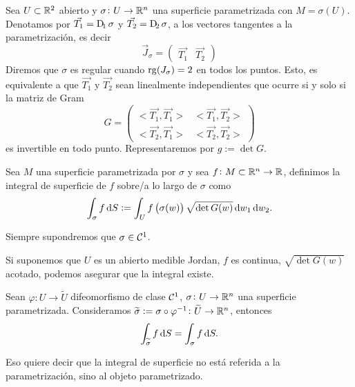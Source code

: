 \begin{defi}
    Sea $U \subset  \mathbb{R}^2$ abierto y $\sigma \colon U \to \mathbb{R}^n$ una superficie parametrizada con $M = \sigma(U)$. Denotamos por
    $\vec{T_1} = \Dif_1\sigma$ y $\vec{T_2} = \Dif_2 \sigma$, a los vectores tangentes a la parametrización, es decir
    \[
        \vec{J}_\sigma =
        \begin{pmatrix}
            \vec{T_1} & \vec{T_2}
        \end{pmatrix}
    \]
    Diremos que $\sigma$ es regular cuando $\operatorname{rg}(J_\sigma) = 2$ en todos los puntos. Esto, es equivalente a que $\vec{T_1}$ y $\vec{T_2}$ sean
    linealmente independientes que ocurre si y solo si la matriz de Gram
    \[
        G = 
        \begin{pmatrix}
            <\vec{T_1}, \vec{T_1}> & <\vec{T_1}, \vec{T_2}> \\
            <\vec{T_2}, \vec{T_1}> & <\vec{T_2}, \vec{T_2}>
        \end{pmatrix}
    \]
    es invertible en todo punto. Representaremos por $g := \det G$.
\end{defi}

\begin{defi}
    Sea $M$ una superficie parametrizada por $\sigma$ y sea $f \colon M \subset \mathbb{R}^n \to \mathbb{R}$, definimos la integral de superficie de $f$
    sobre/a lo largo de $\sigma$ como
    \[
        \int_\sigma f \dif S := \int_U f\left( \sigma(w) \right) \sqrt{\det G(w)} \dif w_1 \dif w_2.
    \]
\end{defi}

\begin{obs*}
    Siempre supondremos que $\sigma \in \mathcal{C}^1$.
\end{obs*}

\begin{obs*}
    Si suponemos que $U$ es un abierto medible Jordan, $f$ es continua, $\sqrt{\det G(w)}$ acotado, podemos asegurar que la integral existe.
\end{obs*}

\begin{lema}
    Sean $\varphi \colon U \to \widetilde{U}$ difeomorfismo de clase $\mathcal{C}^1$, $\sigma \colon U \to \mathbb{R}^n$ una superficie parametrizada.
    Consideramos $\widetilde{\sigma} := \sigma \circ \varphi^{-1} \colon \widetilde{U} \to \mathbb{R}^n$, entonces
    \[
        \int_{\widetilde{\sigma}} f \dif S = \int_\sigma f \dif S.
    \]
\end{lema}

\begin{obs*}
    Eso quiere decir que la integral de superficie no está referida a la parametrización, sino al objeto parametrizado.
\end{obs*}

